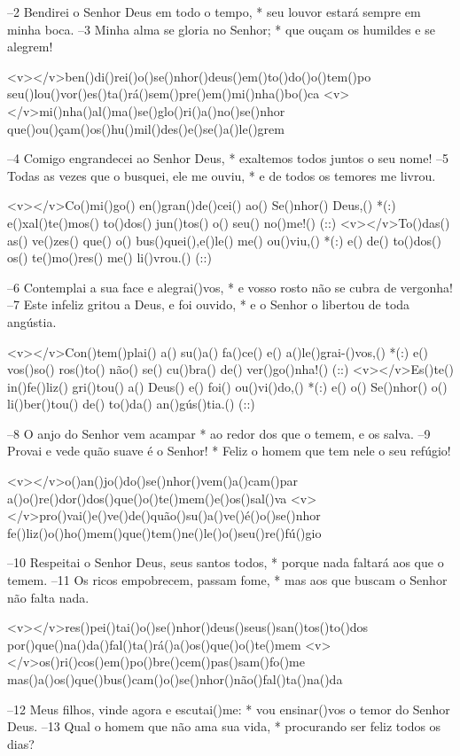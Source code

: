 –2 Bendirei o Senhor Deus em todo o tempo, *
seu louvor estará sempre em minha boca.
–3 Minha alma se gloria no Senhor; *
que ouçam os humildes e se alegrem!

<v></v>ben()di()rei()o()se()nhor()deus()em()to()do()o()tem()po
seu()lou()vor()es()ta()rá()sem()pre()em()mi()nha()bo()ca
<v></v>mi()nha()al()ma()se()glo()ri()a()no()se()nhor
que()ou()çam()os()hu()mil()des()e()se()a()le()grem

–4 Comigo engrandecei ao Senhor Deus, *
exaltemos todos juntos o seu nome!
–5 Todas as vezes que o busquei, ele me ouviu, *
e de todos os temores me livrou.

<v></v>Co()mi()go() en()gran()de()cei() ao() Se()nhor() Deus,() *(:)
e()xal()te()mos() to()dos() jun()tos() o() seu() no()me!() (::)
<v></v>To()das() as() ve()zes() que() o() bus()quei(),e()le() me() ou()viu,() *(:)
e() de() to()dos() os() te()mo()res() me() li()vrou.() (::)

–6 Contemplai a sua face e alegrai()vos, *
e vosso rosto não se cubra de vergonha!
–7 Este infeliz gritou a Deus, e foi ouvido, *
e o Senhor o libertou de toda angústia.

<v></v>Con()tem()plai() a() su()a() fa()ce() e() a()le()grai-()vos,() *(:)
e() vos()so() ros()to() não() se() cu()bra() de() ver()go()nha!() (::)
<v></v>Es()te() in()fe()liz() gri()tou() a() Deus() e() foi() ou()vi()do,() *(:)
e() o() Se()nhor() o() li()ber()tou() de() to()da() an()gús()tia.() (::)

–8 O anjo do Senhor vem acampar *
ao redor dos que o temem, e os salva.
–9 Provai e vede quão suave é o Senhor! *
Feliz o homem que tem nele o seu refúgio!

<v></v>o()an()jo()do()se()nhor()vem()a()cam()par
a()o()re()dor()dos()que()o()te()mem()e()os()sal()va
<v></v>pro()vai()e()ve()de()quão()su()a()ve()é()o()se()nhor
fe()liz()o()ho()mem()que()tem()ne()le()o()seu()re()fú()gio

–10 Respeitai o Senhor Deus, seus santos todos, *
porque nada faltará aos que o temem.
–11 Os ricos empobrecem, passam fome, *
mas aos que buscam o Senhor não falta nada.

<v></v>res()pei()tai()o()se()nhor()deus()seus()san()tos()to()dos
por()que()na()da()fal()ta()rá()a()os()que()o()te()mem
<v></v>os()ri()cos()em()po()bre()cem()pas()sam()fo()me
mas()a()os()que()bus()cam()o()se()nhor()não()fal()ta()na()da

–12 Meus filhos, vinde agora e escutai()me: *
vou ensinar()vos o temor do Senhor Deus.
–13 Qual o homem que não ama sua vida, *
procurando ser feliz todos os dias?

